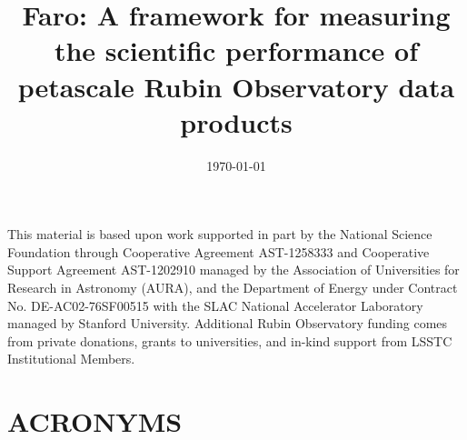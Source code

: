 \documentclass[]{spie}
\title{Faro: A framework for measuring the scientific performance of petascale Rubin Observatory data products}
\date{\today}
\def\acronyms{\section*{ACRONYMS}\label{sec:acronyms}}
\begin{document}
\maketitle



\listoftodos



\clearpage
\appendix
%

\acknowledgments

This material is based upon work supported in part by the National Science Foundation through Cooperative Agreement AST-1258333 and Cooperative Support Agreement AST-1202910 managed by the Association of Universities for Research in Astronomy (AURA), and the Department of Energy under Contract No. DE-AC02-76SF00515 with the SLAC National Accelerator Laboratory managed by Stanford University. 
Additional Rubin Observatory funding comes from private donations, grants to universities, and in-kind support from LSSTC Institutional Members.




\acronyms 

\end{document}
